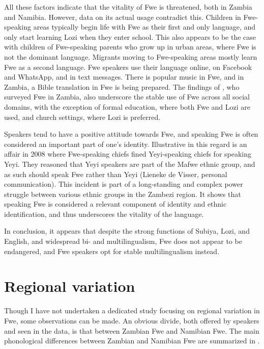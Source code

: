 All these factors indicate that the vitality of Fwe is threatened, both in Zambia and Namibia. However, data on its actual usage contradict this. Children in Fwe-speaking areas typically begin life with Fwe as their first and only language, and only start learning Lozi when they enter school. This also appears to be the case with children of Fwe-speaking parents who grow up in urban areas, where Fwe is not the dominant language. Migrants moving to Fwe-speaking areas mostly learn Fwe as a second language. Fwe speakers use their language online, on Facebook and WhatsApp, and in text messages. There is popular music in Fwe, and in Zambia, a Bible translation in Fwe is being prepared. The findings of {\citet{SakuhukaEtAl2011}}, who surveyed Fwe in Zambia, also underscore the stable use of Fwe across all social domains, with the exception of formal education, where both Fwe and Lozi are used, and church settings, where Lozi is preferred.

Speakers tend to have a positive attitude towards Fwe, and speaking Fwe is often considered an important part of one’s identity. Illustrative in this regard is an affair in 2008 where Fwe-speaking chiefs fined Yeyi-speaking chiefs for speaking Yeyi. They reasoned that Yeyi speakers are part of the Mafwe ethnic group, and as such should speak Fwe rather than Yeyi (Lieneke de Visser, personal communication). This incident is part of a long-standing and complex power struggle between various ethnic groups in the Zambezi region. It shows that speaking Fwe is considered a relevant component of identity and ethnic identification, and thus underscores the vitality of the language.

In conclusion, it appears that despite the strong functions of Subiya, Lozi, and English, and widespread bi- and multilingualism, Fwe does not appear to be endangered, and Fwe speakers opt for stable multilingualism instead.

\section{Regional variation}
\hypertarget{Toc75352597}{}\label{bkm:Ref450562330}
Though I have not undertaken a dedicated study focusing on regional variation in Fwe, some observations can be made. An obvious divide, both offered by speakers and seen in the data, is that between Zambian Fwe and Namibian Fwe. The main phonological differences between Zambian and Namibian Fwe are summarized in .

